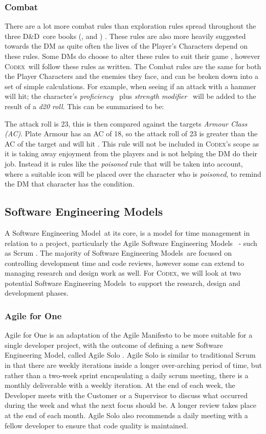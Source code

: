 \documentclass[review]{cmpreport}
\newcommand{\dnd}{D\&D}
\newcommand{\sem}{Software Engineering Model}
\newcommand{\sems}{Software Engineering Models}
\newcommand{\Codex}{\textsc{Codex}}
\begin{document}
	\subsubsection{Combat} \label{DnDCombat}
	There are a lot more combat rules than exploration rules spread throughout the three \dnd \ core books (\cite{DMGuide}, \cite{MonsterManual} and \cite{PlayerHandbook}) . These rules are also more heavily suggested towards the DM as quite often the lives of the Player's Characters depend on these rules. Some DMs do choose to alter these rules to suit their game \citep{Personal}, however \Codex \ will follow these rules as written. The Combat rules are the same for both the Player Characters and the enemies they face, and can be broken down into a set of simple calculations. For example, when seeing if an attack with a hammer will hit; the character's \emph{proficiency} \ plus \emph{strength modifier} \ will be added to the result of a \emph{d20 roll}. This can be summarised to be:

	The attack roll is 23, this is then compared against the targets \emph{Armour Class (AC)}. Plate Armour has an AC of 18, so the attack roll of 23 is greater than the AC of the target and will hit \citep{PlayerHandbook}. This rule will not be included in \Codex's scope as it is taking away enjoyment from the players and is not helping the DM do their job. Instead it is rules like the \emph{poisoned} rule that will be taken into account, where a suitable icon will be placed over the character who is \emph{poisoned}, to remind the DM that  character has the condition.
	
	\subsection{Software Engineering Models} \label{SEMLit}
	A \sem \ at its core, is a model for time management in relation to a project, particularly the Agile \sems \ \citep{AgileManifesto} - such as Scrum  \citep{Scrum} . The majority of \sems \ are focused on controlling development time and code reviews, however some can extend to managing research and design work as well. For \Codex, we will look at two potential \sems \ to support the research, design and development phases. 
	 
	\subsubsection{Agile for One}
	Agile for One is an adaptation of the Agile Manifesto to be more suitable for a single developer project, with the outcome of defining a new \sem , called Agile Solo \citep{AgileSolo}. Agile Solo is similar to traditional Scrum in that there are weekly iterations inside a longer over-arching period of time, but rather than a two-week sprint encapsulating a daily scrum meeting, there is a monthly deliverable with a weekly iteration. At the end of each week, the Developer meets with the Customer or a Supervisor to discuss what occurred during the week and what the next focus should be. A longer review takes place at the end of each month. Agile Solo also recommends a daily meeting with a fellow developer to ensure that code quality is maintained. 
	
\end{document}
